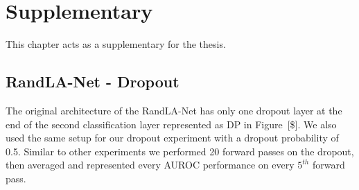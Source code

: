 


    \chapter{Supplementary}
    This chapter acts as a supplementary for the thesis.
    \section{RandLA-Net - Dropout}
    \label{sec:randladout}
    The original architecture of the RandLA-Net has only one dropout layer at the end of the second classification layer represented as DP in Figure~[\$].
    We also used the same setup for our dropout experiment with a dropout probability of 0.5.
    Similar to other experiments we performed 20 forward passes on the dropout, then averaged and represented every AUROC performance on every $5^{th}$ forward pass.

